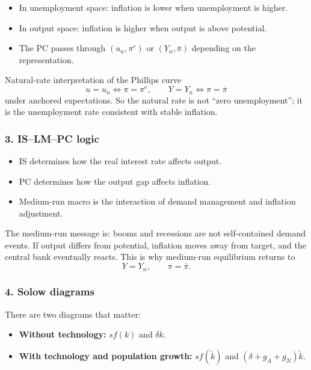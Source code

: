 \documentclass[12pt]{article}
\begin{document}
\begin{itemize}[leftmargin=1.5em]
    \item In unemployment space: inflation is lower when unemployment is higher.
    \item In output space: inflation is higher when output is above potential.
    \item The PC passes through $(u_n,\pi^e)$ or $(Y_n,\bar{\pi})$ depending on the representation.
\end{itemize}

\begin{theorem}{Natural-rate interpretation of the Phillips curve}{}
\[
u=u_n \iff \pi=\pi^e,
\qquad
Y=Y_n \iff \pi=\bar{\pi}
\]
under anchored expectations. So the natural rate is not ``zero unemployment''; it is the unemployment rate consistent with stable inflation.
\end{theorem}

\subsubsection*{3. IS--LM--PC logic}

\begin{itemize}[leftmargin=1.5em]
    \item IS determines how the real interest rate affects output.
    \item PC determines how the output gap affects inflation.
    \item Medium-run macro is the interaction of demand management and inflation adjustment.
\end{itemize}

\begin{policynote}
The medium-run message is: booms and recessions are not self-contained demand events. If output differs from potential, inflation moves away from target, and the central bank eventually reacts. This is why medium-run equilibrium returns to
\[
Y=Y_n,\qquad \pi=\bar{\pi}.
\]
\end{policynote}

\subsubsection*{4. Solow diagrams}

There are two diagrams that matter:
\begin{itemize}[leftmargin=1.5em]
    \item \textbf{Without technology:} $sf(k)$ and $\delta k$.
    \item \textbf{With technology and population growth:} $sf(\tilde{k})$ and $(\delta+g_A+g_N)\tilde{k}$.
\end{itemize}
\end{document}
